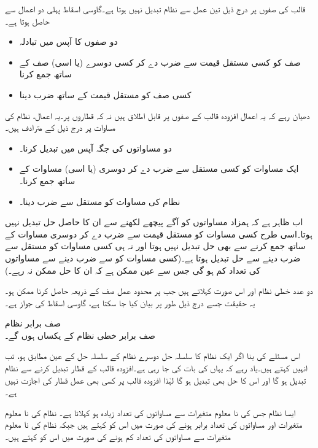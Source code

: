 قالب کی صفوں پر درج ذیل تین عمل سے نظام تبدیل نہیں ہوتا ہے۔گاوسی اسقاط پہلی دو اعمال سے حاصل ہوتا ہے۔
\begin{itemize}
\item
دو صفوں کا آپس میں تبادلہ
\item
صف کو کسی مستقل قیمت سے ضرب دے کر کسی دوسرے (یا اسی) صف کے ساتھ جمع کرنا
\item
کسی صف کو  مستقل قیمت  کے ساتھ ضرب دینا
\end{itemize} 
دھیان رہے کہ یہ اعمال افزودہ قالب کے صفوں پر قابل اطلاق ہیں نہ کہ قطاروں پر۔یہ اعمال، نظام کی مساوات پر درج ذیل کے مترادف ہیں۔
\begin{itemize}
\item
دو مساواتوں کی جگہ آپس میں تبدیل کرنا۔
\item
ایک مساوات کو کسی مستقل سے ضرب دے کر دوسری (یا اسی) مساوات کے ساتھ جمع کرنا۔
\item
نظام کی مساوات کو  مستقل  سے ضرب دینا۔
\end{itemize}

اب ظاہر ہے کہ ہمزاد مساواتوں کو آگے پیچھے لکھنے سے ان کا حاصل حل تبدیل نہیں ہوتا۔اسی طرح کسی مساوات کو مستقل قیمت سے ضرب دے کر دوسری مساوات کے ساتھ جمع کرنے سے بھی حل تبدیل نہیں ہوتا اور نہ ہی کسی مساوات کو  مستقل سے ضرب دینے سے حل تبدیل ہوتا ہے۔(کسی مساوات کو  سے ضرب دینے سے  مساواتوں کی تعداد کم ہو گی جس سے عین ممکن ہے کہ ان کا حل ممکن نہ رہے۔)

دو عدد خطی نظام  اور  اس صورت  کہلاتے ہیں جب  پر محدود عمل صف کے ذریعہ  حاصل کرنا ممکن ہو۔ یہ حقیقت جسے درج ذیل طور پر بیان کیا جا سکتا ہے، گاوسی اسقاط کی جواز ہے۔

\quad صف برابر نظام\\
صف برابر خطی نظام کے  یکساں ہوں گے۔

اس مسئلے کی بنا اگر ایک نظام کا سلسلہ حل دوسرے نظام کے سلسلہ حل کے عین مطابق ہو، تب انہیں  کہتے ہیں۔یاد رہے کہ یہاں  کی بات کی جا رہی ہے۔افزودہ قالب کے قطار تبدیل کرنے سے نظام تبدیل ہو گا اور اس کا حل بھی تبدیل ہو گا لہٰذا افزودہ قالب پر کسی بھی عمل قطار کی اجازت نہیں ہے۔  

ایسا نظام جس کی نا معلوم متغیرات سے مساواتوں کی تعداد زیادہ ہو  کہلاتا ہے۔ نظام  کی نا معلوم متغیرات اور مساواتوں کی تعداد برابر ہونے کی صورت میں اس کو  کہتے ہیں جبکہ  نظام  کی نا معلوم متغیرات سے مساواتوں کی تعداد کم ہونے کی صورت میں اس کو   کہتے ہیں۔

